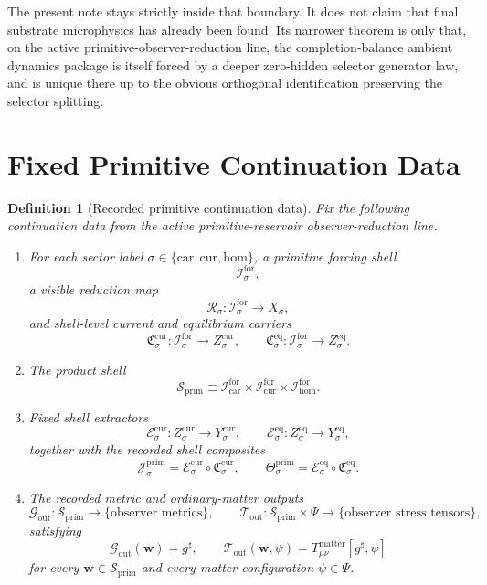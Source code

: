 \documentclass[11pt]{article}
\newcommand{\CompletedMetric}{g^{\sharp}}
\newcommand{\Car}{\mathrm{car}}
\newcommand{\Cur}{\mathrm{cur}}
\newcommand{\Hom}{\mathrm{hom}}
\newcommand{\ForSpace}[1]{\mathcal I_{#1}^{\mathrm{for}}}
\newcommand{\PrimShell}{\mathcal S_{\mathrm{prim}}}
\newcommand{\Reduction}[1]{\mathcal R_{#1}}
\newcommand{\CurrentCarrier}[1]{\mathfrak C_{#1}^{\mathrm{cur}}}
\newcommand{\EqCarrier}[1]{\mathfrak C_{#1}^{\mathrm{eq}}}
\newcommand{\CurrentExtract}[1]{\mathscr E_{#1}^{\mathrm{cur}}}
\newcommand{\EqExtract}[1]{\mathscr E_{#1}^{\mathrm{eq}}}
\newcommand{\PrimCurrent}[1]{\mathcal J_{#1}^{\mathrm{prim}}}
\newcommand{\PrimTheta}[1]{\Theta_{#1}^{\mathrm{prim}}}
\newcommand{\MetricOut}{\mathscr G_{\mathrm{out}}}
\newcommand{\MatterOut}{\mathscr T_{\mathrm{out}}}
\newtheorem{definition}{Definition}
\begin{document}
The present note stays strictly inside that boundary. It does not claim that final substrate microphysics has already been found. Its narrower theorem is only that, on the active primitive-observer-reduction line, the completion-balance ambient dynamics package is itself forced by a deeper zero-hidden selector generator law, and is unique there up to the obvious orthogonal identification preserving the selector splitting.

\section{Fixed Primitive Continuation Data}

\begin{definition}[Recorded primitive continuation data]
\label{def:fixed}
Fix the following continuation data from the active primitive-reservoir observer-reduction line.
\begin{enumerate}
    \item For each sector label \(\sigma\in\{\Car,\Cur,\Hom\}\), a primitive forcing shell
    \[
    \ForSpace{\sigma},
    \]
    a visible reduction map
    \[
    \Reduction{\sigma}:\ForSpace{\sigma}\to X_{\sigma},
    \]
    and shell-level current and equilibrium carriers
    \[
    \CurrentCarrier{\sigma}:\ForSpace{\sigma}\to Z_{\sigma}^{\mathrm{cur}},
    \qquad
    \EqCarrier{\sigma}:\ForSpace{\sigma}\to Z_{\sigma}^{\mathrm{eq}}.
    \]
    \item The product shell
    \[
    \PrimShell
    \equiv
    \ForSpace{\Car}\times \ForSpace{\Cur}\times \ForSpace{\Hom}.
    \]
    \item Fixed shell extractors
    \[
    \CurrentExtract{\sigma}:Z_{\sigma}^{\mathrm{cur}}\to Y_{\sigma}^{\mathrm{cur}},
    \qquad
    \EqExtract{\sigma}:Z_{\sigma}^{\mathrm{eq}}\to Y_{\sigma}^{\mathrm{eq}},
    \]
    together with the recorded shell composites
    \begin{equation}
    \PrimCurrent{\sigma}
    =
    \CurrentExtract{\sigma}\circ \CurrentCarrier{\sigma},
    \qquad
    \PrimTheta{\sigma}
    =
    \EqExtract{\sigma}\circ \EqCarrier{\sigma}.
    \label{eq:primcomposites}
    \end{equation}
    \item The recorded metric and ordinary-matter outputs
    \[
    \MetricOut:\PrimShell\to\{\text{observer metrics}\},
    \qquad
    \MatterOut:\PrimShell\times\Psi\to\{\text{observer stress tensors}\},
    \]
    satisfying
    \begin{equation}
    \MetricOut(\mathbf w)=\CompletedMetric,
    \qquad
    \MatterOut(\mathbf w,\psi)
    =
    T_{\mu\nu}^{\mathrm{matter}}[\CompletedMetric,\psi]
    \label{eq:fixedoutputs}
    \end{equation}
    for every \(\mathbf w\in\PrimShell\) and every matter configuration \(\psi\in\Psi\).
\end{enumerate}
\end{definition}
\end{document}
